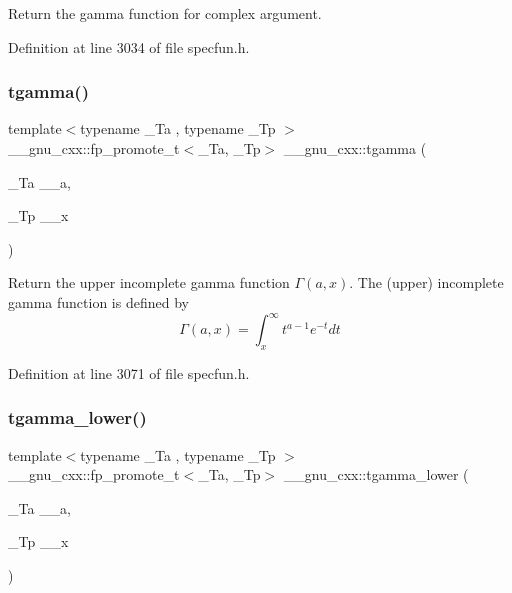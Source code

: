 Return the gamma function for complex argument. 

Definition at line 3034 of file specfun.\+h.

\mbox{\label{group__gnu__math__spec__func_ga264207c0040cd3877fad455121da8518}} 
\subsubsection{\texorpdfstring{tgamma()}{tgamma()}\hspace{0.1cm}{\footnotesize\ttfamily [3/3]}}
{\footnotesize\ttfamily template$<$typename \+\_\+\+Ta , typename \+\_\+\+Tp $>$ \\
\+\_\+\+\_\+gnu\+\_\+cxx\+::fp\+\_\+promote\+\_\+t$<$\+\_\+\+Ta, \+\_\+\+Tp$>$ \+\_\+\+\_\+gnu\+\_\+cxx\+::tgamma (\begin{DoxyParamCaption}\item[{\+\_\+\+Ta}]{\+\_\+\+\_\+a,  }\item[{\+\_\+\+Tp}]{\+\_\+\+\_\+x }\end{DoxyParamCaption})\hspace{0.3cm}{\ttfamily [inline]}}

Return the upper incomplete gamma function $ \Gamma(a,x) $. The (upper) incomplete gamma function is defined by \[ \Gamma(a,x) = \int_x^\infty t^{a-1}e^{-t}dt \] 

Definition at line 3071 of file specfun.\+h.

\mbox{\label{group__gnu__math__spec__func_gaed107908dec8865ea48e7764f7ea88a2}} 
\subsubsection{\texorpdfstring{tgamma\+\_\+lower()}{tgamma\_lower()}}
{\footnotesize\ttfamily template$<$typename \+\_\+\+Ta , typename \+\_\+\+Tp $>$ \\
\+\_\+\+\_\+gnu\+\_\+cxx\+::fp\+\_\+promote\+\_\+t$<$\+\_\+\+Ta, \+\_\+\+Tp$>$ \+\_\+\+\_\+gnu\+\_\+cxx\+::tgamma\+\_\+lower (\begin{DoxyParamCaption}\item[{\+\_\+\+Ta}]{\+\_\+\+\_\+a,  }\item[{\+\_\+\+Tp}]{\+\_\+\+\_\+x }\end{DoxyParamCaption})\hspace{0.3cm}{\ttfamily [inline]}}

